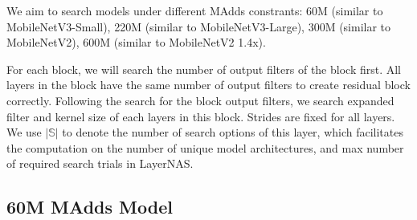 
We aim to search models under different MAdds constrants: 60M (similar to MobileNetV3-Small), 220M (similar to MobileNetV3-Large), 300M (similar to MobileNetV2), 600M (similar to MobileNetV2 1.4x). 

For each block, we will search the number of output filters of the block first. All layers in the block have the same number of output filters to create residual block correctly. Following the search for the block output filters, we search expanded filter and kernel size of each layers in this block. Strides are fixed for all layers. We use $|\mathbb{S}|$ to denote the number of search options of this layer, which facilitates the computation on the number of unique model architectures, and max number of required search trials in LayerNAS.


\subsection{60M MAdds Model}



